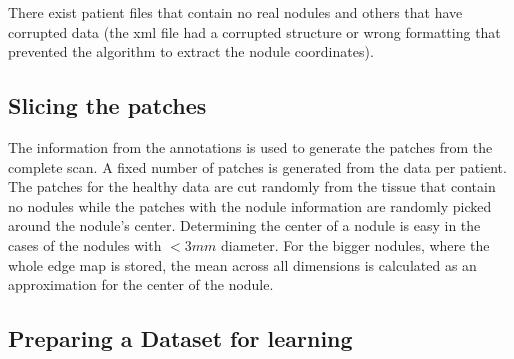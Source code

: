 \documentclass[../Thesis.tex]{subfiles}
\begin{document}
There exist patient files that contain no real nodules and others that have corrupted data (the xml file had a corrupted structure or wrong formatting that prevented the algorithm to extract the nodule coordinates).

\subsection{Slicing the patches}
The information from the annotations is used to generate the patches from the complete scan. A fixed number of patches is generated from the data per patient. The patches for the healthy data are cut randomly from the tissue that contain no nodules while the patches with the nodule information are randomly picked around the nodule's center. Determining the center of a nodule is easy in the cases of the nodules with $<3mm$ diameter. For the bigger nodules, where the whole edge map is stored, the mean across all dimensions is calculated as an approximation for the center of the nodule.

\subsection{Preparing a Dataset for learning}
\end{document}
